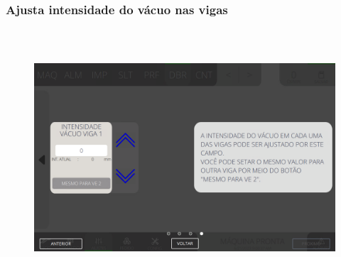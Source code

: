 \newpage
\thispagestyle{fancy}
\vspace*{40 pt}
\subsubsection{\small{Ajusta intensidade do vácuo nas vigas}}\label{miniTelaAjustesDobraIntensidadeVacuoVigas}
\vspace*{\fill}
\begin{figure}[h]
  \centering
  \includegraphics[width=576px,height=360px]{src/imagesMiniline/07-Folder/Settings/e4.png}
\end{figure}
\vspace*{\fill}

\newpage
\thispagestyle{fancy}
\vspace*{40 pt}
